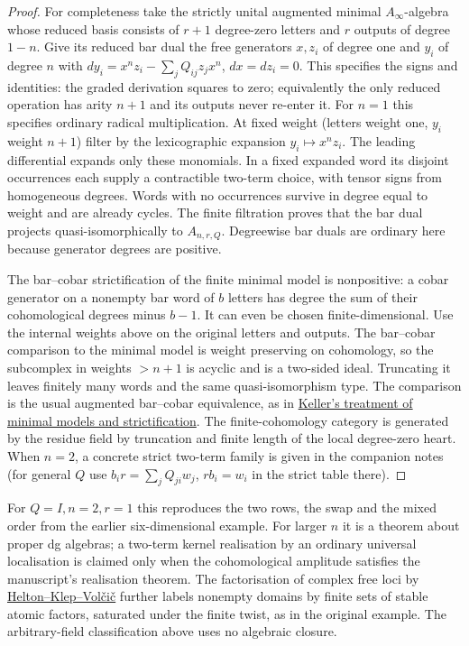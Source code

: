 \documentclass[11pt]{article}
\begin{document}
\begin{proof}
For completeness take the strictly unital augmented minimal
$A_\infty$-algebra whose reduced basis consists of $r+1$ degree-zero
letters and $r$ outputs of degree $1-n$. Give its reduced bar dual the
free generators $x,z_i$ of degree one and $y_i$ of degree $n$ with
$d y_i=x^nz_i-\sum_jQ_{ij}z_jx^n$, $dx=dz_i=0$.
This specifies the signs and identities: the graded derivation squares
to zero; equivalently the only reduced operation has arity $n+1$ and
its outputs never re-enter it. For $n=1$ this specifies ordinary
radical multiplication. At fixed weight (letters weight one, $y_i$
weight $n+1$) filter by the lexicographic expansion $y_i\mapsto x^n z_i$.
The leading differential expands only these monomials. In a fixed
expanded word its disjoint occurrences each supply a contractible
two-term choice, with tensor signs from homogeneous degrees. Words
with no occurrences survive in degree equal to weight and are already
cycles. The finite filtration proves that the bar dual projects
quasi-isomorphically to $A_{n,r,Q}$. Degreewise bar duals are ordinary
here because generator degrees are positive.

The bar--cobar strictification of the finite minimal model is
nonpositive: a cobar generator on a nonempty bar word of $b$ letters
has degree the sum of their cohomological degrees minus $b-1$.
It can even be chosen finite-dimensional. Use the internal weights
above on the original letters and outputs. The bar--cobar comparison
to the minimal model is weight preserving on cohomology, so the
subcomplex in weights $>n+1$ is acyclic and is a two-sided ideal.
Truncating it leaves finitely many words and the same quasi-isomorphism
type. The comparison is the usual augmented bar--cobar equivalence,
as in \href{https://arxiv.org/abs/math/9910179}{Keller's treatment of
minimal models and strictification}. The finite-cohomology category is
generated by the residue field by truncation and finite length of the
local degree-zero heart. When $n=2$, a concrete strict two-term family
is given in the companion notes (for general $Q$ use $b_i r=
\sum_j Q_{ji} w_j$, $rb_i=w_i$ in the strict table there).
\end{proof}

For $Q=I,n=2,r=1$ this reproduces the two rows, the swap and the mixed
order from the earlier six-dimensional example. For larger $n$ it is a
theorem about proper dg algebras; a two-term kernel realisation by an
ordinary universal localisation is claimed only when the cohomological
amplitude satisfies the manuscript's realisation theorem. The
factorisation of complex free loci by
\href{https://arxiv.org/abs/1907.04328}{Helton--Klep--Vol\v ci\v c}
further labels nonempty domains by finite sets of stable atomic factors,
saturated under the finite twist, as in the original example. The
arbitrary-field classification above uses no algebraic closure.
\end{document}

